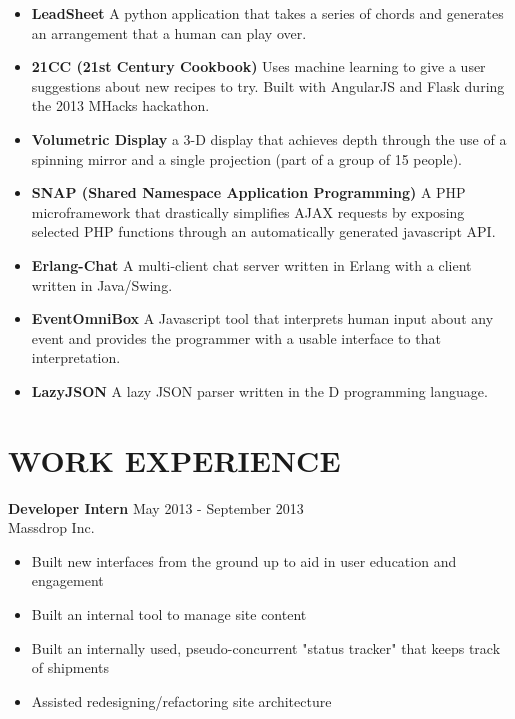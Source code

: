 \documentclass[line,margin]{res}
\begin{document}
\begin{resume}
\begin{itemize}
\item {\bf LeadSheet} A python application that takes a series of chords
  and generates an arrangement that a human can play over. 

\item {\bf 21CC (21st Century Cookbook)} Uses machine learning to give a user 
   suggestions about new recipes to try. Built with AngularJS and Flask during
   the 2013 MHacks hackathon.

\item {\bf Volumetric Display} a 3-D display that achieves depth through the 
   use of a spinning mirror and a single projection 
   (part of a group of 15 people).

\item {\bf SNAP (Shared Namespace Application Programming)} 
   A PHP microframework that drastically simplifies AJAX requests by 
   exposing selected PHP functions through an automatically generated
   javascript API.




\item {\bf Erlang-Chat}   A multi-client chat server written in Erlang with a 
   client written in Java/Swing.

\item {\bf EventOmniBox}  A Javascript tool that interprets human input about 
   any event and provides the programmer with a usable interface to that 
   interpretation.


\item {\bf LazyJSON}  A lazy JSON parser written in the D programming language.


\end{itemize}
 
\section{WORK EXPERIENCE} 
			   {\bf Developer Intern} \hfill May 2013 - September 2013\\
			   Massdrop Inc.
			   \begin{itemize} \itemsep -2pt
				  \item Built new interfaces from the ground up to aid in user education and engagement
				  \item Built an internal tool to manage site content
				  \item Built an internally used, pseudo-concurrent "status tracker" that keeps track
					 of shipments
				  \item Assisted redesigning/refactoring site architecture
			   \end{itemize}


\end{resume}
\end{document}
